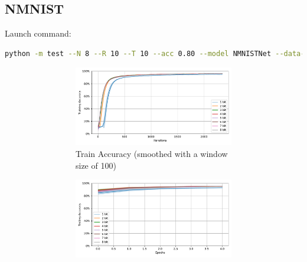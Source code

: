     \subsection{NMNIST}
    \label{appendix:accuracy_curves_nmnist}
        Launch command: 
        \begin{lstlisting}[language=Bash, basicstyle=\small, breaklines=true]
python -m test --N 8 --R 10 --T 10 --acc 0.80 --model NMNISTNet --data-path /scratch/zyi/codeSpace/data --dataset NMNIST --batch-size 128 --opt adam --lr 2e-3 --lr-scheduler none --epochs 5 --lr-warmup-epochs 0 --output-dir /scratch/zyi/codeSpace/MultibitSpikes --mixup-alpha 0.0 --cutmix-alpha 0.0 --label-smoothing 0.0 --disable-amp
        \end{lstlisting}

        \begin{figure}[H]
            \centering
            \begin{subfigure}[H]{0.69\textwidth}
                \centering
                \begin{subfigure}[H]{\textwidth}
                    \centering
                    \includegraphics[width=\textwidth]{../standard/NMNIST/plots/nmnist_train_acc.pdf}
                    \caption{Train Accuracy (smoothed with a window size of 100)}
                \end{subfigure}
                \hfill
                \begin{subfigure}[H]{\textwidth}
                    \centering
                    \includegraphics[width=\textwidth]{../standard/NMNIST/plots/nmnist_test_acc.pdf}

\end{subfigure}
\end{subfigure}
\end{figure}
